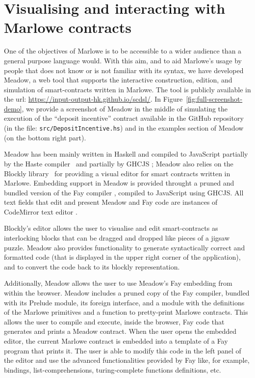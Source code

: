 \documentclass[runningheads]{llncs}
\begin{document}
\section{Visualising and interacting with Marlowe contracts}

\label{section:tool}

One of the objectives of Marlowe is to be accessible to a wider audience
than a general purpose language would. With this aim, and to aid Marlowe's
usage by people that does not know or is not familiar with its syntax,
we have developed Meadow, a web tool that supports the interactive construction,
edition, and simulation of smart-contracts written in Marlowe. The
tool is publicly available in the url: \url{https://input-output-hk.github.io/scdsl/}.
In Figure~\ref{fig:full-screenshot-demo}, we provide a screenshot
of Meadow in the middle of simulating the execution of the ``deposit incentive'' contract available
in the GitHub repository (in the file: \texttt{src/DepositIncentive.hs}) and in the examples section of Meadow (on the 
bottom right part).

Meadow has been mainly written in Haskell and compiled to JavaScript
partially by the Haste compiler~\cite{Haste} and partially by GHCJS \cite{GHCJS};
Meadow also relies on the Blockly library~\cite{Blockly} for providing a visual
editor for smart contracts written in Marlowe. Embedding support in Meadow
is provided throught a pruned and bundled version of the Fay compiler \cite{Fay},
compiled to JavaScript using GHCJS. All text fields that edit and present Meadow and Fay code are
instances of CodeMirror text editor \cite{CodeMirror}.

Blockly's editor allows the user to visualise and edit
smart-contracts as interlocking blocks that can be dragged and dropped
like pieces of a jigsaw puzzle. %
Meadow also provides functionality to generate syntactically correct
and formatted code (that is displayed in the upper right corner of the application),
and to convert the code back to its blockly representation.

Additionally, Meadow allows the user to use Meadow's Fay embedding from within the browser. %
Meadow includes a pruned copy of the Fay compiler, bundled with its Prelude module, 
its foreign interface, and a module with the definitions of the Marlowe primitives and a function to pretty-print 
Marlowe contracts. This allows the user to compile and execute, inside the browser, Fay
code that generates and prints a Meadow contract. When the user opens the embedded editor, the current Marlowe contract 
is embedded into a template of a Fay program that prints it. The user is able to modify this code in the left 
panel of the editor and use the advanced functionalities provided by Fay like, for example, bindings, 
list-comprehensions, turing-complete functions definitions, etc.
\end{document}
